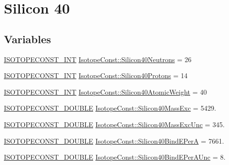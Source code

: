 \hypertarget{group___isotope_const-_silicon-_si40}{}\section{Silicon 40}
\label{group___isotope_const-_silicon-_si40}
\subsection*{Variables}
\begin{DoxyCompactItemize}
\item 
\mbox{\hyperlink{group___isotope_const-_macros_ga5f18360b3e99483a35c32d789e62621c}{I\+S\+O\+T\+O\+P\+E\+C\+O\+N\+S\+T\+\_\+\+I\+NT}} \mbox{\hyperlink{group___isotope_const-_silicon-_si40_gad6b21240a79cff24ee2f600ea94b0337}{Isotope\+Const\+::\+Silicon40\+Neutrons}} = 26
\item 
\mbox{\hyperlink{group___isotope_const-_macros_ga5f18360b3e99483a35c32d789e62621c}{I\+S\+O\+T\+O\+P\+E\+C\+O\+N\+S\+T\+\_\+\+I\+NT}} \mbox{\hyperlink{group___isotope_const-_silicon-_si40_ga27204a6a59c238b1f00c1f9e7df17332}{Isotope\+Const\+::\+Silicon40\+Protons}} = 14
\item 
\mbox{\hyperlink{group___isotope_const-_macros_ga5f18360b3e99483a35c32d789e62621c}{I\+S\+O\+T\+O\+P\+E\+C\+O\+N\+S\+T\+\_\+\+I\+NT}} \mbox{\hyperlink{group___isotope_const-_silicon-_si40_ga150f087ebbda82c48b01b349cdbffc56}{Isotope\+Const\+::\+Silicon40\+Atomic\+Weight}} = 40
\item 
\mbox{\hyperlink{group___isotope_const-_macros_ga8f45a7272ce02c0b4c65c44636ed719a}{I\+S\+O\+T\+O\+P\+E\+C\+O\+N\+S\+T\+\_\+\+D\+O\+U\+B\+LE}} \mbox{\hyperlink{group___isotope_const-_silicon-_si40_ga3dca2a52dee4470a604f76719e16d7bc}{Isotope\+Const\+::\+Silicon40\+Mass\+Exc}} = 5429.
\item 
\mbox{\hyperlink{group___isotope_const-_macros_ga8f45a7272ce02c0b4c65c44636ed719a}{I\+S\+O\+T\+O\+P\+E\+C\+O\+N\+S\+T\+\_\+\+D\+O\+U\+B\+LE}} \mbox{\hyperlink{group___isotope_const-_silicon-_si40_gabc9b2e88d2085d6639614d778bfac518}{Isotope\+Const\+::\+Silicon40\+Mass\+Exc\+Unc}} = 345.
\item 
\mbox{\hyperlink{group___isotope_const-_macros_ga8f45a7272ce02c0b4c65c44636ed719a}{I\+S\+O\+T\+O\+P\+E\+C\+O\+N\+S\+T\+\_\+\+D\+O\+U\+B\+LE}} \mbox{\hyperlink{group___isotope_const-_silicon-_si40_ga9c6c0c7c670f68eefabf58fa589b5478}{Isotope\+Const\+::\+Silicon40\+Bind\+E\+PerA}} = 7661.
\item 
\mbox{\hyperlink{group___isotope_const-_macros_ga8f45a7272ce02c0b4c65c44636ed719a}{I\+S\+O\+T\+O\+P\+E\+C\+O\+N\+S\+T\+\_\+\+D\+O\+U\+B\+LE}} \mbox{\hyperlink{group___isotope_const-_silicon-_si40_ga55f44e73886d577de7f270f0927a429d}{Isotope\+Const\+::\+Silicon40\+Bind\+E\+Per\+A\+Unc}} = 8.

\end{DoxyCompactItemize}
